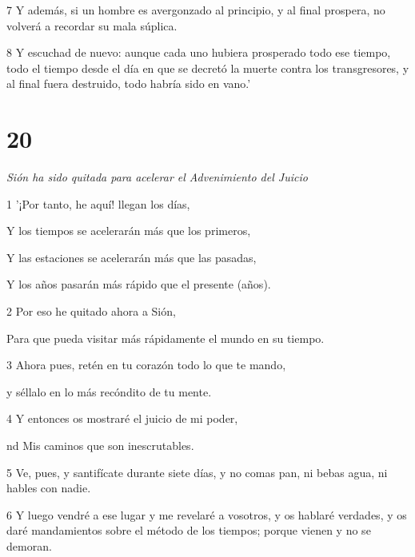 \par 7 Y además, si un hombre es avergonzado al principio, y al final prospera, no volverá a recordar su mala súplica.

\par 8 Y escuchad de nuevo: aunque cada uno hubiera prosperado todo ese tiempo, todo el tiempo desde el día en que se decretó la muerte contra los transgresores, y al final fuera destruido, todo habría sido en vano.'

\chapter{20}

\par \textit{Sión ha sido quitada para acelerar el Advenimiento del Juicio}

\par 1 '¡Por tanto, he aquí! llegan los días,

\par Y los tiempos se acelerarán más que los primeros,

\par Y las estaciones se acelerarán más que las pasadas,

\par Y los años pasarán más rápido que el presente (años).

\par 2 Por eso he quitado ahora a Sión,

\par Para que pueda visitar más rápidamente el mundo en su tiempo.

\par 3 Ahora pues, retén en tu corazón todo lo que te mando,

\par y séllalo en lo más recóndito de tu mente.

\par 4 Y entonces os mostraré el juicio de mi poder,

\par nd Mis caminos que son inescrutables.

\par 5 Ve, pues, y santifícate durante siete días, y no comas pan, ni bebas agua, ni hables con nadie.

\par 6 Y luego vendré a ese lugar y me revelaré a vosotros, y os hablaré verdades, y os daré mandamientos sobre el método de los tiempos; porque vienen y no se demoran.

